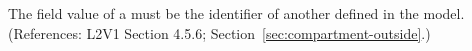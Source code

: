 The  field value of a \Compartment must be the identifier of
another \Compartment defined in the model.  (References: L2V1 Section
4.5.6; Section~\ref{sec:compartment-outside}.)
